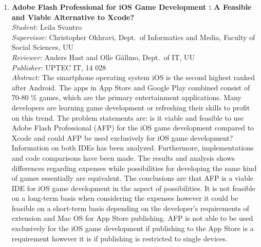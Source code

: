 \begin{small}
\begin{enumerate}
\item\textbf{Adobe Flash Professional for iOS Game Development : A Feasible and Viable Alternative to Xcode?}\\
  \emph{Student:} Leila Svantro\\
  \emph{Supervisor:} Christopher Okhravi, Dept.~of Informatics and Media,  Faculty of Social Sciences, UU\\
  \emph{Reviewer:} Anders Hast and Olle Gällmo, Dept.~of IT, UU\\
  \emph{Publisher:} UPTEC IT, 14 028\\
  \emph{Abstract:} The smartphone operating system iOS is the second highest ranked after Android. The apps in App Store and Google Play combined consist of 70-80 \% games, which are the primary entertainment applications. Many developers are learning game development or refreshing their skills to profit on this trend. The problem statements are: is it viable and feasible to use Adobe Flash Professional (AFP) for the iOS game development compared to Xcode and could AFP be used exclusively for iOS game development? Information on both IDEs has been analyzed. Furthermore, implementations and code comparisons have been made. The results and analysis shows differences regarding expenses while possibilities for developing the same kind of games essentially are equivalent. The conclusions are that AFP is a viable IDE for iOS game development in the aspect of possibilities. It is not feasible on a long-term basis when considering the expenses however it could be feasible on a short-term basis depending on the developer’s requirements of extension and Mac OS for App Store publishing. AFP is not able to be used exclusively for the iOS game development if publishing  to the App Store is a requirement however it is if publishing  is restricted to single devices.


\end{enumerate}
\end{small}
